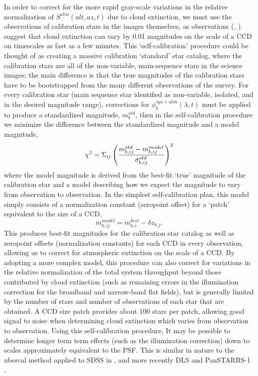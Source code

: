 \documentclass[12pt,preprint]{aastex}
\begin{document}
In order to correct for the more rapid gray-scale variations in the
relative normalization of $S^{atm}(alt,az,t)$ due to cloud extinction,
we must use the observations of calibration stars in the images themselves, as
 observations (\citep{Burke13}, \citep{Ivezic2007}) suggest that cloud extinction can vary by 0.01 magnitudes on the scale of a CCD
on timescales as fast as a few minutes. This
`self-calibration' procedure could be thought of as creating a massive
calibration `standard' star catalog, where the calibration stars are
all of the non-variable, main-sequence stars in the science images;
the main difference is that the true magnitudes of the calibration
stars have to be bootstrapped from the many different observations of
the survey. For every calibration star (main sequence star identified as non-variable,
isolated, and in the desired magnitude range), corrections for
 $\phi_b^{sys+atm}(\lambda,t)$ must be
applied to produce a standardized magnitude, $m_b^{std}$, then in the
self-calibration procedure we minimize the difference between the
standardized magnitude and a model magnitude,
\begin{equation}
\label{eqn:chi2}
\chi^2 = \Sigma_{ij} \left( { m_{b,ij}^{std} - m_{b,ij}^{model} \over
\sigma_{b,ij}^{std} } \right)^2
\end{equation}
where the model magnitude is derived from the best-fit `true'
magnitude of the calibration star and a model describing how we expect
the magnitude to vary from observation to observation. In the simplest
self-calibration plan, this model simply consists of a normalization constant
(zeropoint offset) for a `patch' equivalent to the size of a CCD,
\begin{equation}
\label{eqn:modelmag}
m_{b,ij}^{model} = m_{b,i}^{best} - \delta z_{b,j}.
\end{equation}
This produces best-fit magnitudes for the calibration star catalog as
well as zeropoint offsets (normalization constants) for each CCD in
every observation, allowing us to correct for atmospheric extinction
on the scale of a CCD. By adopting a more complex model, this
procedure can also correct for variations in the relative
normalization of the total system throughput beyond those contributed
by cloud extinction (such as remaining errors in the illumination
correction for the broadband and narrow-band flat fields), but is
generally limited by the number of stars and number of observations of
each star that are obtained. A CCD size patch provides about 100 stars
per patch, allowing good signal to noise when determining cloud
extinction which varies from observation to observation.  Using this
self-calibration procedure, It may be
possible to determine longer term term effects (such as the
illumination correction) down to scales approximately equivalent to
the PSF. This is similar in
nature to the ubercal method applied to SDSS in
\citet{Padmanabhan2008}, and more recently DLS \citep{Wittman} and PanSTARRS-1 \citep{xx}.
\end{document}
